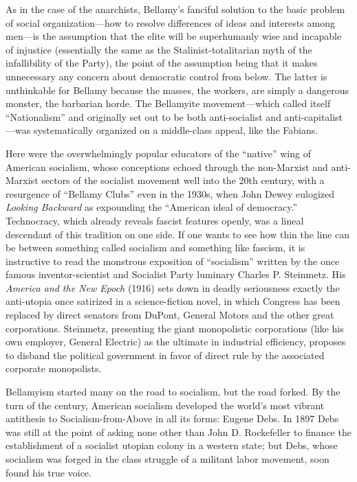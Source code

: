 As in the case of the anarchists, Bellamy's fanciful solution to the basic problem of social organization---how to resolve differences of ideas and interests among men---is the assumption that the elite will be superhumanly wise and incapable of injustice (essentially the same as the Stalinist-totalitarian myth of the infallibility of the Party), the point of the assumption being that it makes unnecessary any concern about democratic control from below. The latter is unthinkable for Bellamy because the masses, the workers, are simply a dangerous monster, the barbarian horde. The Bellamyite movement---which called itself ``Nationalism'' and originally set out to be both anti-socialist and anti-capitalist---was systematically organized on a middle-class appeal, like the Fabians.

Here were the overwhelmingly popular educators of the ``native'' wing of American socialism, whose conceptions echoed through the non-Marxist and anti-Marxist sectors of the socialist movement well into the 20th century, with a resurgence of ``Bellamy Clubs'' even in the 1930s, when John Dewey eulogized \emph{Looking Backward} as expounding the ``American ideal of democracy.'' Technocracy, which already reveals fascist features openly, was a lineal descendant of this tradition on one side. If one wants to see how thin the line can be between something called socialism and something like fascism, it is instructive to read the monstrous exposition of ``socialism'' written by the once famous inventor-scientist and Socialist Party luminary Charles P. Steinmetz. His \emph{America and the New Epoch} (1916) sets down in deadly seriousness exactly the anti-utopia once satirized in a science-fiction novel, in which Congress has been replaced by direct senators from DuPont, General Motors and the other great corporations. Steinmetz, presenting the giant monopolistic corporations (like his own employer, General Electric) as the ultimate in industrial efficiency, proposes to disband the political government in favor of direct rule by the associated corporate monopolists.

Bellamyism started many on the road to socialism, but the road forked. By the turn of the century, American socialism developed the world's most vibrant antithesis to Socialism-from-Above in all its forms: Eugene Debs. In 1897 Debs was still at the point of asking none other than John D. Rockefeller to finance the establishment of a socialist utopian colony in a western state; but Debs, whose socialism was forged in the class struggle of a militant labor movement, soon found his true voice.

